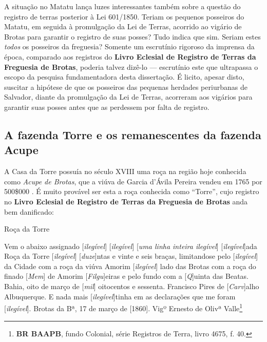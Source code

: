 A situação no Matatu lança luzes interessantes também sobre a questão do registro de terras posterior à Lei 601/1850. Teriam os pequenos posseiros do Matatu, em seguida à promulgação da Lei de Terras, acorrido ao vigário de Brotas para garantir o registro de suas posses? Tudo indica que sim. Seriam estes \textit{todos} os posseiros da freguesia? Somente um escrutínio rigoroso da imprensa da época, comparado aos registros do \textbf{Livro Eclesial de Registro de Terras da Freguesia de Brotas}, poderia talvez dizê-lo --- escrutínio este que ultrapassa o escopo da pesquisa fundamentadora desta dissertação. É licito, apesar disto, suscitar a hipótese de que os posseiros das pequenas herdades periurbanas de Salvador, diante da promulgação da Lei de Terras, acorreram aos vigários para garantir suas posses antes que as perdessem por falta de registro.

\subsection{A fazenda Torre e os remanescentes da fazenda Acupe}

A Casa da Torre possuía no século XVIII uma roça na região hoje conhecida como \textit{Acupe de Brotas}, que a viúva de Garcia d'Ávila Pereira vendeu em 1765 por 500\$000 \cite[p.~10]{ott_engenhos_1996}. É muito provável ser esta a roça conhecida como ``Torre'', cujo registro no \textbf{Livro Eclesial de Registro de Terras da Freguesia de Brotas} anda bem danificado:

\begin{citacao}
Roça da Torre

Vem o abaixo assignado [\textit{ilegível}] [\textit{ilegível}] [\textit{uma linha inteira ilegível}] [\textit{ilegível}]ada Roça da Torre [\textit{ilegível}] [\textit{duze}]ntas e vinte e seis braças, limitandose pelo [\textit{ilegível}] da Cidade com a roça da viúva Amorim [\textit{ilegível}] lado das Brotas com a roça do finado [\textit{Mem}] de Amorim [\textit{Filgu}]eiras e pelo fundo com a [\textit{Q}]uinta das Beatas. Bahia, oito de março de [\textit{mil}] oitocentos e sessenta. Francisco Pires de [\textit{Carv}]alho Albuquerque. E nada mais [\textit{ilegível}]tinha em as declarações que me foram [\textit{ilegível}]. Brotas da Bª, 17 de março de [1860]. Vigº Ernesto de Olivª Valle\footnote{\textbf{BR BAAPB}, fundo Colonial, série Registros de Terra, livro 4675, f. 40.}
\end{citacao}

